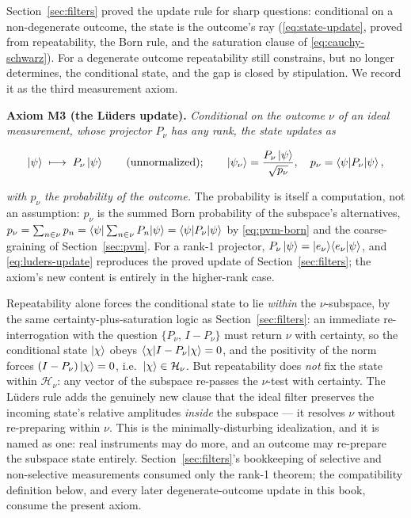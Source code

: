 Section~\ref{sec:filters} proved the update rule for sharp questions: conditional on a non-degenerate outcome, the state is the outcome's ray (\eqref{eq:state-update}, proved from repeatability, the Born rule, and the saturation clause of \eqref{eq:cauchy-schwarz}). For a degenerate outcome repeatability still constrains, but no longer determines, the conditional state, and the gap is closed by stipulation. We record it as the third measurement axiom.

\medskip\noindent\textbf{Axiom M3 (the L\"uders update).} \emph{Conditional on the outcome $\nu$ of an ideal measurement, whose projector $P_\nu$ has any rank, the state updates as}
\begin{linenomath}
\begin{equation}
    \ket{\psi}\;\longmapsto\;P_\nu\ket{\psi}
    \qquad\text{(unnormalized);}
    \qquad
    \ket{\psi_\nu}=\frac{P_\nu\ket{\psi}}{\sqrt{p_\nu}},
    \quad
    p_\nu=\braket{\psi|P_\nu|\psi},
    \label{eq:luders-update}
\end{equation}
\end{linenomath}
\emph{with $p_\nu$ the probability of the outcome.} The probability is itself a computation, not an assumption: $p_\nu$ is the summed Born probability of the subspace's alternatives, $p_\nu=\sum_{n\in\nu}p_n=\braket{\psi|\sum_{n\in\nu}P_n|\psi}=\braket{\psi|P_\nu|\psi}$ by \eqref{eq:pvm-born} and the coarse-graining of Section~\ref{sec:pvm}. For a rank-1 projector, $P_\nu\ket{\psi}=\ket{e_\nu}\!\braket{e_\nu|\psi}$, and \eqref{eq:luders-update} reproduces the proved update of Section~\ref{sec:filters}; the axiom's new content is entirely in the higher-rank case.

\begin{note}
Repeatability alone forces the conditional state to lie \emph{within} the $\nu$-subspace, by the same certainty-plus-saturation logic as Section~\ref{sec:filters}: an immediate re-interrogation with the question $\{P_\nu,\,I-P_\nu\}$ must return $\nu$ with certainty, so the conditional state $\ket{\chi}$ obeys $\braket{\chi|I-P_\nu|\chi}=0$, and the positivity of the norm forces $(I-P_\nu)\ket{\chi}=0$, i.e.\ $\ket{\chi}\in\mathcal H_\nu$. But repeatability does \emph{not} fix the state within $\mathcal H_\nu$: any vector of the subspace re-passes the $\nu$-test with certainty. The L\"uders rule adds the genuinely new clause that the ideal filter preserves the incoming state's relative amplitudes \emph{inside} the subspace --- it resolves $\nu$ without re-preparing within $\nu$. This is the minimally-disturbing idealization, and it is named as one: real instruments may do more, and an outcome may re-prepare the subspace state entirely. Section~\ref{sec:filters}'s bookkeeping of selective and non-selective measurements consumed only the rank-1 theorem; the compatibility definition below, and every later degenerate-outcome update in this book, consume the present axiom.
\end{note}

